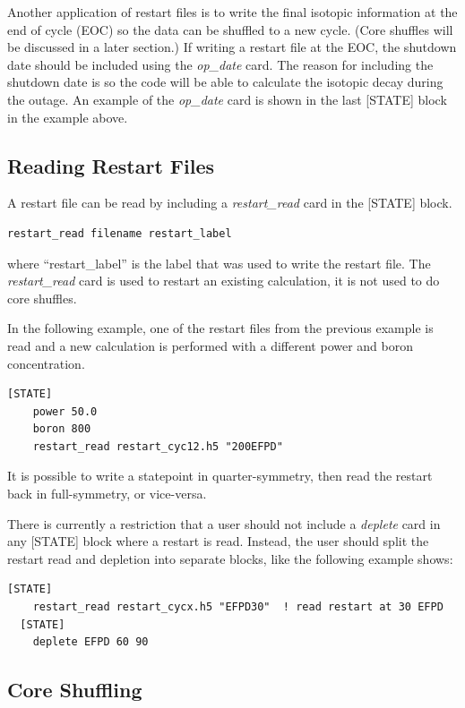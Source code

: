 Another application of restart files is to write the final isotopic information at the end of cycle (EOC)
so the data can be shuffled to a new cycle.  (Core shuffles will be discussed in a later section.)
If writing a restart file at the EOC, the shutdown date should be included using the {\it op\_date} card.
The reason for including the shutdown date is so the code will be able to calculate the isotopic decay
during the outage.  An example of the {\it op\_date} card is shown in the last [STATE] block in the example above.


\subsection{Reading Restart Files}

A restart file can be read by including a {\it restart\_read} card in the [STATE] block.
\begin{Verbatim}[fontsize=\small]
  restart_read filename restart_label
\end{Verbatim}
where ``restart\_label'' is the label that was used to write the restart file.
The {\it restart\_read} card is used to restart an existing calculation, it is
not used to do core shuffles.

In the following example, one of the restart files from the previous example
is read and a new calculation is performed with a different power and boron concentration.
\begin{Verbatim}[fontsize=\small]
  [STATE]
    power 50.0
    boron 800
    restart_read restart_cyc12.h5 "200EFPD"
\end{Verbatim}

It is possible to write a statepoint in quarter-symmetry, then read the restart back in full-symmetry,
or vice-versa.

There is currently a restriction that a user should not include a {\it deplete} card in any
[STATE] block where a restart is read.  Instead, the user should split the restart read and depletion
into separate blocks, like the following example shows:
\begin{Verbatim}[fontsize=\small]
  [STATE]
    restart_read restart_cycx.h5 "EFPD30"  ! read restart at 30 EFPD
  [STATE]
    deplete EFPD 60 90
\end{Verbatim}


\subsection{Core Shuffling}

